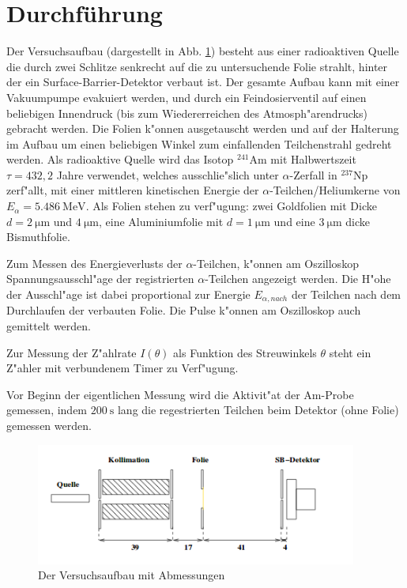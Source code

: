 \section{Durchführung}
  \label{sec:Durchführung}
  Der Versuchsaufbau (dargestellt in Abb. \ref{fig:aufbau}) besteht aus einer radioaktiven Quelle die durch zwei Schlitze senkrecht auf die zu untersuchende Folie strahlt, hinter der ein Surface-Barrier-Detektor verbaut ist.
  Der gesamte Aufbau kann mit einer Vakuumpumpe evakuiert werden, und durch ein Feindosierventil auf einen beliebigen Innendruck (bis zum Wiedererreichen des Atmosph"arendrucks) gebracht werden.
  Die Folien k"onnen ausgetauscht werden und auf der Halterung im Aufbau um einen beliebigen Winkel zum einfallenden Teilchenstrahl gedreht werden.
  Als radioaktive Quelle wird das Isotop $^{241}\text{Am}$ mit Halbwertszeit $\tau=432,2$ Jahre verwendet, welches ausschlie"slich unter $\alpha$-Zerfall in $^{237}\text{Np}$ zerf"allt, mit einer mittleren kinetischen Energie der $\alpha$-Teilchen/Heliumkerne von $E_{\alpha}=\SI{5,486}{\mega \electronvolt}$.
  Als Folien stehen zu verf"ugung: zwei Goldfolien mit Dicke $d=\SI{2}{\micro \meter}$ und $\SI{4}{\micro \meter}$, eine Aluminiumfolie mit $d=\SI{1}{\micro \meter}$ und eine $\SI{3}{\micro \meter}$ dicke Bismuthfolie.

  Zum Messen des Energieverlusts der $\alpha$-Teilchen, k"onnen am Oszilloskop Spannungsausschl"age der registrierten  $\alpha$-Teilchen angezeigt werden. Die H"ohe der Ausschl"age ist dabei proportional zur Energie $E_{\alpha,nach}$ der Teilchen nach dem Durchlaufen der verbauten Folie.
  Die Pulse k"onnen am Oszilloskop auch gemittelt werden.

  Zur Messung der Z"ahlrate $I(\theta)$ als Funktion des Streuwinkels $\theta$ steht ein Z"ahler mit verbundenem Timer zu Verf"ugung.

  Vor Beginn der eigentlichen Messung wird die Aktivit"at der Am-Probe gemessen, indem $\SI{200}{\second}$ lang die regestrierten Teilchen beim Detektor (ohne Folie) gemessen werden.

  \begin{figure}
    \centering
    \includegraphics[height=4cm]{bilder/aufbau.png}
    \caption{Der Versuchsaufbau mit Abmessungen \cite{Anleitung}}
    \label{fig:aufbau}
  \end{figure}



